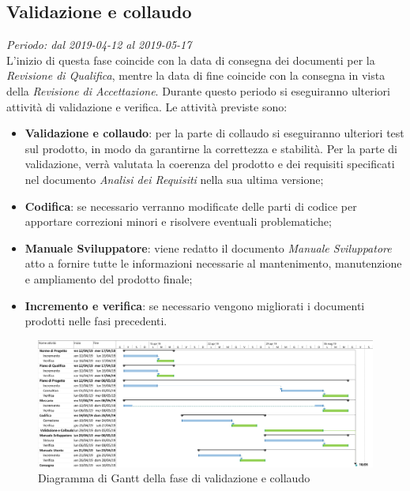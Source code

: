 \subsection{Validazione e collaudo}
\textit{Periodo: dal 2019-04-12 al 2019-05-17 } \\
L'inizio di questa fase coincide con la data di consegna dei documenti per la 
\textit{Revisione di Qualifica}, mentre la data di fine coincide con la 
consegna in vista della \textit{Revisione di Accettazione}. Durante questo periodo 
si eseguiranno ulteriori attività di validazione e verifica. Le attività 
previste sono: 
\begin{itemize}	
	\item \textbf{Validazione e collaudo}: per la parte di collaudo si 
	eseguiranno ulteriori test sul prodotto, in modo da garantirne la 
	correttezza e stabilità. Per la parte di validazione, verrà 
	valutata la coerenza del prodotto e dei requisiti specificati nel documento 
	\textit{Analisi dei Requisiti} nella sua ultima versione;
	\item \textbf{Codifica}: se necessario verranno modificate delle parti di codice per apportare correzioni minori e risolvere eventuali problematiche;
	\item \textbf{Manuale Sviluppatore}: viene redatto il documento \textit{Manuale Sviluppatore} atto a fornire tutte le informazioni necessarie al mantenimento, manutenzione e ampliamento del prodotto finale;
	\item \textbf{Incremento e verifica}: se necessario vengono migliorati i 
	documenti prodotti nelle fasi precedenti.
\end{itemize}
\begin{figure}[H]
	\includegraphics[width=0.99\linewidth]{res/images/gantt_val.jpg}
	\caption{Diagramma di Gantt della fase di validazione e collaudo}
\end{figure}